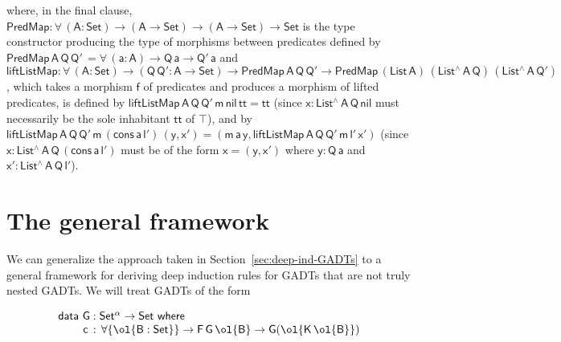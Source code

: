 \documentclass[9pt]{entcs}
\begin{document}
\noindent
where, in the final clause, $\mathsf{PredMap : \forall\, (A : Set) \to
  (A \to Set) \to (A \to Set) \to Set }$ is the type constructor
producing the type of morphisms between predicates defined by
$\mathsf{PredMap \,A\, Q\,Q'\, = \forall\, (a : A) \to Q\,a \to
  Q'\,a}$ and $\mathsf{liftListMap : \forall\, (A : Set) \to (Q \, Q'
  : A \to Set) \to PredMap\,A\,Q\,Q' \to PredMap\,(List\,A)
  \,(List^{\wedge}\, A\, Q)\, (List^{\wedge}\, A\, Q')}$, which takes
a morphism $\mathsf{f}$ of predicates and produces a morphism of
lifted predicates, is defined by $\mathsf{liftListMap\, A\, Q\, Q'\,
  m\, nil\, tt = tt}$ (since $\mathsf{x : List^{\wedge}\, A\, Q\,
  nil}$ must necessarily be the sole inhabitant $\mathsf{tt}$ of
$\mathsf{\top}$), and by $\mathsf{liftListMap\, A\, Q\, Q'\, m\,
  (cons\, a\, l')\, (y, x') = (m\,a\,y, liftListMap\, A\, Q\, Q'\, m\,
  l'\, x')}$ (since $\mathsf{x : List^{\wedge}\, A\, Q\, (cons\, a\,
  l')}$ must be of the form $\mathsf{x = (y, x')}$ where
$\mathsf{y : Q\,a}$ and $\mathsf{x' : List^{\wedge}\, A\, Q\, l'}$).

\vspace*{-0.05in}

\section{The general framework}\label{sec:framework}

We can generalize the approach taken in
Section~\ref{sec:deep-ind-GADTs} to a general framework for deriving
deep induction rules for GADTs that are not truly nested GADTs. We
will treat GADTs of the form

\vspace*{-0.05in}

\begin{equation}\label{eq:gadts}
\begin{array}{l}
  \mathsf{data\ G : Set^\alpha
    \to Set\ where}\\
\mathsf{\;\;\;\;\;\;\;\;c\, :\, \forall \{\ol{B : Set}\} \to F\,G\,\ol{B} \to G (\ol{K\,\ol{B}})}
\end{array}
\end{equation}
\end{document}
